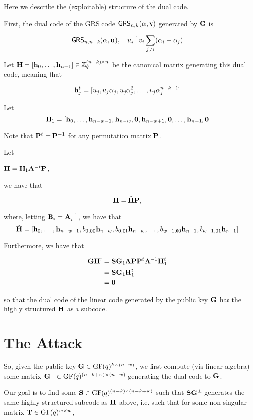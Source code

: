 \documentclass[oribibl,envcountsect,envcountsame]{llncs}
\newcommand{\GRS}{\textsf{GRS}}
\newcommand{\GF}{\text{GF}}
\begin{document}
Here we describe the (exploitable) structure of the dual code. 

First, the dual code of the GRS code $\GRS_{n,k}(\vecalpha,\vecv)$ generated by
$\bar{\mathbf{G}}$ is 

\[\GRS_{n,n-k}(\vecalpha,\vecu),\quad u_i^{-1} v_i \sum_{j \neq
    i}(\alpha_{i}-\alpha_{j})\]

Let $\bar{\mathbf{H}}=[\mathbf{h}_0, \ldots, \mathbf{h}_{n-1}] \in \mathbb{Z}_q^{(n-k) \times
  n}$ be the canonical matrix generating this dual code, meaning that 

\[\mathbf{h}_{j}^t=[u_j, u_j\alpha_j, u_j\alpha_j^2, \ldots, u_j\alpha_j^{n-k-1}]\]

Let \[\mathbf{H}_{1} = [\mathbf{h}_0, \ldots, \mathbf{h}_{n-w-1}, \mathbf{h}_{n-w},
\mathbf{0},\mathbf{h}_{n-w+1},\mathbf{0},\ldots,\mathbf{h}_{n-1},\mathbf{0}\]

Note that $\mathbf{P}^{t}=\mathbf{P}^{-1}$ for any permutation matrix $\mathbf{P}$.


Let

$\mathbf{H}=\mathbf{H}_{1}\mathbf{A}^{-t}\mathbf{P}$, 

we have that 

\[\mathbf{H}=\tilde{\mathbf{H}}\mathbf{P},\]

where, letting $\mathbf{B}_i=\mathbf{A}_{i}^{-1}$, we have that 
\[\tilde{\mathbf{H}}=[\mathbf{h}_0, \ldots, \mathbf{h}_{n-w-1}, b_{0,00}\mathbf{h}_{n-w},
  b_{0,01}\mathbf{h}_{n-w},
  \ldots, b_{w-1,00}\mathbf{h}_{n-1}, b_{w-1,01}\mathbf{h}_{n-1}]\]

Furthermore, we have that

\begin{align*}\mathbf{G}\mathbf{H}^{t}&=\mathbf{S}\mathbf{G}_{1}\mathbf{A}\mathbf{P}\mathbf{P}^{t}\mathbf{A}^{-1}\mathbf{H}_{1}^{t}\\
&=\mathbf{S}\mathbf{G}_{1}\mathbf{H}_{1}^{t}\\
&=\mathbf{0}\\
\end{align*}

so that the dual code of the linear code generated by the public key
$\mathbf{G}$ has the highly structured $\mathbf{H}$ as a subcode. 

\section{The Attack}
\label{sec:attack}


So, given the public key $\matG \in \GF(q)^{k \times (n+w)}$, we first
compute (via linear algebra) some matrix $\matG^{\perp} \in
\GF(q)^{(n-k+w)\times (n+w)}$ generating the dual code to $\mathbf{G}$.

Our goal is to find some $\matS \in \GF(q)^{(n-k)\times (n-k+w)}$ such
that 
$\mathbf{S}\mathbf{G}^{\perp}$ generates the same highly structured subcode as
$\mathbf{H}$ above, i.e. such that for some non-singular matrix $\matT \in
\GF(q)^{w \times w}$, 
\end{document}
